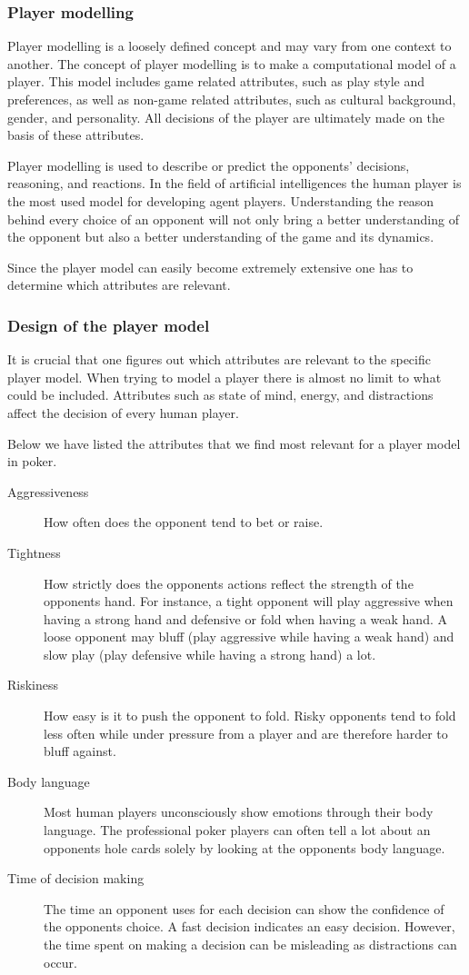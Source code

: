 \subsubsection{Player modelling}
\label{sec:pm}
Player modelling is a loosely defined concept and may vary from one context to another. The concept of player modelling is to make a computational model of a player. This model includes game related attributes, such as play style and preferences, as well as non-game related attributes, such as cultural background, gender, and personality. All decisions of the player are ultimately made on the basis of these attributes. 

Player modelling is used to describe or predict the opponents' decisions, reasoning, and reactions. In the field of artificial intelligences the human player is the most used model for developing agent players. Understanding the reason behind every choice of an opponent will not only bring a better understanding of the opponent but also a better understanding of the game and its dynamics.

Since the player model can easily become extremely extensive one has to determine which attributes are relevant.

\subsubsection{Design of the player model}
It is crucial that one figures out which attributes are relevant to the specific player model. When trying to model a player there is almost no limit to what could be included. Attributes such as state of mind, energy, and distractions affect the decision of every human player.  

Below we have listed the attributes that we find most relevant for a player model in poker.

\begin{description}
\item[Aggressiveness] How often does the opponent tend to bet or raise.
\item[Tightness] How strictly does the opponents actions reflect the strength of the opponents hand. For instance, a tight opponent will play aggressive when having a strong hand and defensive or fold when having a weak hand. A loose opponent may bluff (play aggressive while having a weak hand) and slow play (play defensive while having a strong hand) a lot.
\item[Riskiness] How easy is it to push the opponent to fold. Risky opponents tend to fold less often while under pressure from a player and are therefore harder to bluff against.
\item[Body language] Most human players unconsciously show emotions through their body language. The professional poker players can often tell a lot about an opponents hole cards solely by looking at the opponents body language.
\item[Time of decision making] The time an opponent uses for each decision can show the confidence of the opponents choice. A fast decision indicates an easy decision. However, the time spent on making a decision can be misleading as distractions can occur.
\end{description}

